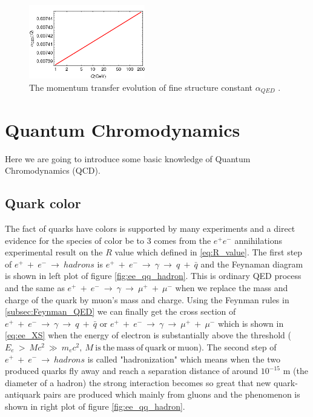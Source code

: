 \begin{figure}[h!]
 \begin{center}
\includegraphics[width=0.45\textwidth]{figures/theory/alphaQED.png}
\caption{The momentum transfer evolution of fine structure constant $\alpha_{QED}$ \cite{Roberts:2012sv}.}
  \label{fig:running_QED}
 \end{center}
\end{figure}


\clearpage
\section{Quantum Chromodynamics}\label{subsec:QCD}
Here we are going to introduce some basic knowledge of Quantum Chromodynamics (QCD).
\subsection{Quark color}\label{subsec:quark_color}
The fact of quarks have colors is supported by many experiments and a direct evidence for the species of color be to 3 comes from the $e^{+}e^{-}$ annihilations experimental result on the $R$ value which defined in \ref{eq:R_value}. The first step of $e^{+}~+~e^{-}~\rightarrow~hadrons$ is $e^{+}~+~e^{-}~\rightarrow~\gamma~\rightarrow~q~+~\bar{q}$ and the Feynaman diagram is shown in left plot of figure \ref{fig:ee_qq_hadron}. This is ordinary QED process and the same as $e^{+}~+~e^{-}~\rightarrow~\gamma~\rightarrow~\mu^{+}~+~\mu^{-}$ when we replace the mass and charge of the quark by muon's mass and charge. Using the Feynman rules in \ref{subsec:Feynman_QED} we can finally get the cross section of $e^{+}~+~e^{-}~\rightarrow~\gamma~\rightarrow~q~+~\bar{q}$ or $e^{+}~+~e^{-}~\rightarrow~\gamma~\rightarrow~\mu^{+}~+~\mu^{-}$ which is shown in \ref{eq:ee_XS} when the energy of electron is substantially above the threshold ($E_{e}~>~Mc^{2}~\gg~m_{e}c^{2},~M~\mathrm{is~the~mass~of~quark~or~muon}$). The second step of $e^{+}~+~e^{-}~\rightarrow~hadrons$ is called "hadronization" which means when the two produced quarks fly away and reach a separation distance of around $10^{-15}$ m (the diameter of a hadron) the strong interaction becomes so great that new quark-antiquark pairs are produced which mainly from gluons and the phenomenon is shown in right plot of figure \ref{fig:ee_qq_hadron}.

